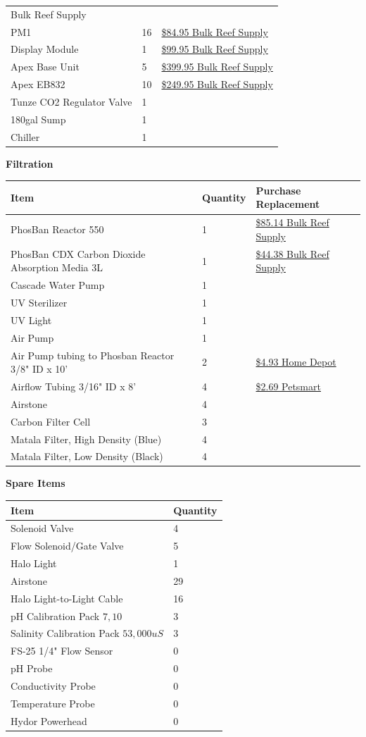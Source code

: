 \documentclass[]{book}
\begin{document}
\begin{longtable}[]{@{}lll@{}}
{Bulk Reef Supply}\tabularnewline
PM1 & 16 &
\href{https://www.bulkreefsupply.com/ph-orp-probe-module-pm1-neptune-systems.html}{\$84.95
Bulk Reef Supply}\tabularnewline
Display Module & 1 &
\href{https://www.bulkreefsupply.com/apex-display-module-neptune-systems.html}{\$99.95
Bulk Reef Supply}\tabularnewline
Apex Base Unit & 5 &
\href{https://www.bulkreefsupply.com/apex-controller-base-unit-neptune-systems.html}{\$399.95
Bulk Reef Supply}\tabularnewline
Apex EB832 & 10 &
\href{https://www.bulkreefsupply.com/energybar-832-neptune-systems.html}{\$249.95
Bulk Reef Supply}\tabularnewline
Tunze CO2 Regulator Valve & 1 &\tabularnewline
180gal Sump & 1 &\tabularnewline
Chiller & 1 &\tabularnewline
\bottomrule
\end{longtable}

 \textbf{Filtration}

\begin{longtable}[]{@{}lll@{}}
\toprule
Item & Quantity & Purchase Replacement\tabularnewline
\midrule
\endhead
PhosBan Reactor 550 & 1 &
\href{https://www.bulkreefsupply.com/phosban-reactor-550.html}{\$85.14
Bulk Reef Supply}\tabularnewline
PhosBan CDX Carbon Dioxide Absorption Media 3L & 1 &
\href{https://www.bulkreefsupply.com/cdx-carbon-dioxide-adsorption-media-two-little-fishies.html}{\$44.38
Bulk Reef Supply}\tabularnewline
Cascade Water Pump & 1 &\tabularnewline
UV Sterilizer & 1 &\tabularnewline
UV Light & 1 &\tabularnewline
Air Pump & 1 &\tabularnewline
Air Pump tubing to Phosban Reactor 3/8" ID x 10' & 2 &
\href{https://www.homedepot.com/p/UDP-3-8-in-I-D-x-1-2-in-O-D-x-10-ft-Clear-Vinyl-Tubing-T10006008/304185141}{\$4.93
Home Depot}\tabularnewline
Airflow Tubing 3/16" ID x 8' & 4 &
\href{https://www.petsmart.com/fish/filters-and-pumps/air-and-water-pumps/grreat-choice-airline-tubing-5202767.html}{\$2.69
Petsmart}\tabularnewline
Airstone & 4 &\tabularnewline
Carbon Filter Cell & 3 &\tabularnewline
Matala Filter, High Density (Blue) & 4 &\tabularnewline
Matala Filter, Low Density (Black) & 4 &\tabularnewline
\bottomrule
\end{longtable}

 \textbf{Spare Items}

\begin{longtable}[]{@{}ll@{}}
\toprule
Item & Quantity\tabularnewline
\midrule
\endhead
Solenoid Valve & 4\tabularnewline
Flow Solenoid/Gate Valve & 5\tabularnewline
Halo Light & 1\tabularnewline
Airstone & 29\tabularnewline
Halo Light-to-Light Cable & 16\tabularnewline
pH Calibration Pack \(7,10\) & 3\tabularnewline
Salinity Calibration Pack \(53,000 uS\) & 3\tabularnewline
FS-25 1/4" Flow Sensor & 0\tabularnewline
pH Probe & 0\tabularnewline
Conductivity Probe & 0\tabularnewline
Temperature Probe & 0\tabularnewline
Hydor Powerhead & 0\tabularnewline
\bottomrule
\end{longtable}
\end{document}
